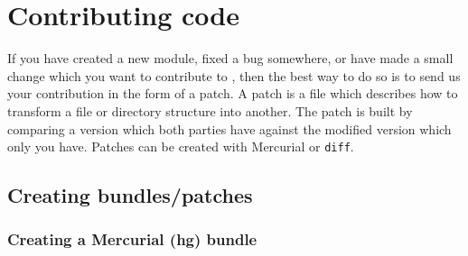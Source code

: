 
\chapter{Contributing code}

If you have created a new module, fixed a bug somewhere, or have made
a small change which you want to contribute to \package{}, then the
best way to do so is to send us your contribution in the form of a
patch. A patch is a file which describes how to transform a file or
directory structure into another. The patch is built by comparing a
version which both parties have against the modified version which
only you have. Patches can be created with Mercurial
or \texttt{diff}.

\section{Creating bundles/patches}
\subsection{Creating a Mercurial (hg) bundle}

